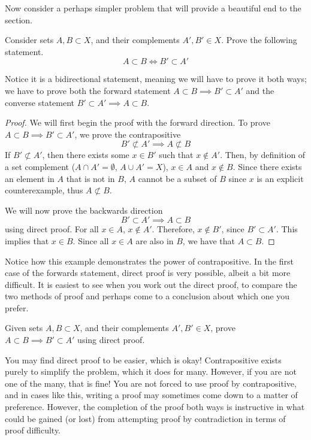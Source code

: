 Now consider a perhaps simpler problem that will provide a beautiful end to the section.

\begin{example}
    Consider sets $A, B \subset X$, and their complements $A', B' \in X$. Prove the following statement. 
    \[
    A \subset B \iff B' \subset A'
    \]
\end{example}

Notice it is a bidirectional statement, meaning we will have to prove it both ways; we have to prove both the forward statement $A \subset B \implies B' \subset A'$ and the converse statement $B' \subset A' \implies A \subset B$. 

\begin{proof}
We will first begin the proof with the forward direction. To prove $A \subset B \implies B' \subset A'$, we prove the contrapositive
\[
B' \not\subset A' \implies A \not\subset B
\]
If $B' \not\subset A'$, then there exists some $x \in B'$ such that $x \notin A'$. Then, by definition of a set complement ($A \cap A' = \emptyset$, $A \cup A' = X$), $x \in A$ and $x \notin B$. Since there exists an element in $A$ that is not in $B$, $A$ cannot be a subset of $B$ since $x$ is an explicit counterexample, thus $A \not\subset B$. 

We will now prove the backwards direction
\[
B' \subset A' \implies A \subset B
\]
using direct proof. For all $x \in A$, $x \notin A'$. Therefore, $x \notin B'$, since $B' \subset A'$. This implies that $x \in B$. Since all $x \in A$ are also in $B$, we have that $A \subset B$. 
\end{proof}

Notice how this example demonstrates the power of contrapositive. In the first case of the forwards statement, direct proof is very possible, albeit a bit more difficult. It is easiest to see when you work out the direct proof, to compare the two methods of proof and perhaps come to a conclusion about which one you prefer.

\begin{exercise}
    Given sets $A, B \subset X$, and their complements $A', B' \in X$, prove $A \subset B \implies B' \subset A'$ using direct proof.
\end{exercise}

You may find direct proof to be easier, which is okay! Contrapositive exists purely to simplify the problem, which it does for many. However, if you are not one of the many, that is fine! You are not forced to use proof by contrapositive, and in cases like this, writing a proof may sometimes come down to a matter of preference. However, the completion of the proof both ways is instructive in what could be gained (or lost) from attempting proof by contradiction in terms of proof difficulty. 

